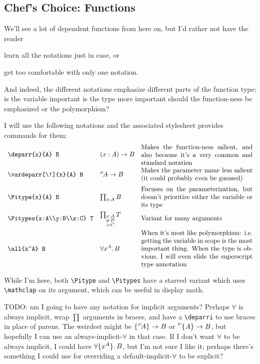 \documentclass[11pt]{article} %
\makeatletter
\newcommand\ltextcell[1]{\begin{array}[c]{@{}l@{}}\textstyle {#1}\end{array}}
\theoremstyle{definition}
\theoremstyle{remark}
\makeatother
\begin{document}
\subsection{Chef's Choice: Functions}


We'll see a lot of dependent functions from here on, but I'd rather not have the reader
  \begin{enumerate*}[label=\textit{\roman*})]
  \item learn all the notations just in case, or
  \item get too comfortable with only one notation.
  \end{enumerate*}
And indeed, the different notations emphasize different parts of the function type: is the variable important\qcomma{} is the type more important\qcomma{} should the function-ness be emphasized\qcomma{} or the polymorphism?

I will use the following notations and the associated stylesheet provides commands for them:
\[\begin{array}{llp{6cm}}
  \verb|\deparr{x}{A} B| & \ltextcell{\deparr{x}{A} B} &
    \parbox{6cm}{Makes the function-ness salient, and also because it's a very common and standard notation} \\
  \verb|\vardeparr[\!]{x}{A} B| & \ltextcell{\vardeparr[\!]{x}{A} B} &
    \parbox{6cm}{Makes the parameter name less salient (it could probably even be guessed)} \\
  \verb|\Pitype{x}{A} B| & \ltextcell{\Pitype{x}{A} B} &
    \parbox{6cm}{Focuses on the parameterization, but doesn't prioritize either the variable or its type} \\
  \verb|\Pitypes{x:A\\y:B\\z:C} T| & \ltextcell{\Pitypes{x:A\\y:B\\z:C} T} &
    \parbox{6cm}{Variant for many arguments} \\
  \verb|\all{x^A} B| & \ltextcell{\all{x^A} B} &
    \parbox{6cm}{When it's most like polymorphism: i.e.\ getting the variable in scope is the most important thing.
    When the type is obvious, I will even elide the superscript type annotation} \\
\end{array}\]
While I'm here, both \verb!\Pitype! and \verb!\Pitypes! have a starred variant which uses \verb!\mathclap! on its argument, which can be useful in display math.


TODO: am I going to have any notation for implicit arguments?
Perhaps $\forall$ is always implicit, wrap $\prod$ arguments in braces, and have a \verb|\deparri| to use braces in place of parens.
The weirdest might be $\{\prescript{x\mathord:\!\!}{}{A}\} \to B$ or $\prescript{{x}\mathord:\!{}}{}{{\{A\}}} \to B$, but hopefully I can use an always-implicit-$\forall$ in that case.
If I don't want $\forall$ to be always implicit, I could have ${\forall}{\{x^A\}}.\,B$, but I'm not sure I like it; perhaps there's something I could use for overriding a default-implicit-$\forall$ to be explicit?
\end{document}
